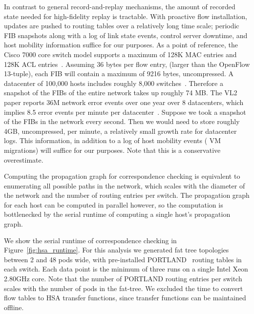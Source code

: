  In contrast to general record-and-replay
mechanisms, the amount of recorded state needed for
high-fidelity replay is tractable. With proactive flow installation, 
updates are pushed to routing tables over a relatively long time scale; periodic
FIB snapshots along with a log of link state events, control server
downtime, and host mobility information suffice for our purposes. As a point of reference, the Cisco 7000 
core switch model supports a maximum of 128K MAC entries and
128K ACL entries~\cite{cisco7000}. Assuming 36 bytes per flow entry,
(larger than the OpenFlow 13-tuple), each FIB will contain a maximum of 9216
bytes, uncompressed. A datacenter of 100,000
hosts includes roughly 8,000
switches~\cite{Al-Fares:2008:SCD:1402958.1402967}.
Therefore a snapshot of the FIBs of the entire network takes up roughly 74 MB.
The VL2 paper reports 36M network error events over one year over 8
datacenters, which implies 8.5 error events per minute per
datacenter~\cite{Greenberg:2009:VSF:1592568.1592576}.
Suppose we took a snapshot of the FIBs in the network every second. 
Then we would need to store roughly 4GB, uncompressed, per minute, a relatively small growth 
rate for datacenter logs. This information, in addition to a log of host
mobility events (\eg{} VM migrations) will suffice for our purposes. Note that this is a conservative overestimate.


 Computing the propagation
graph for correspondence checking is equivalent to enumerating
all possible paths in the network, which scales with the diameter
of the network and the number of routing entries per switch.
The propagation graph for each host can be
computed in parallel however, so the computation is bottlenecked by the serial runtime
of computing a single host's propagation graph.

We show the serial runtime of correspondence checking in 
Figure~\ref{fig:hsa_runtime}. For this analysis we generated fat tree topologies
between 2 and 48 pods wide, with pre-installed PORTLAND~\cite{NiranjanMysore:2009:PSF:1592568.1592575}
routing tables in each switch. Each data point is the minimum of three
runs on a single Intel Xeon 2.80GHz core. Note that the number of PORTLAND routing entries per switch scales with the number
of pods in the fat-tree. We excluded the time to convert
flow tables to HSA transfer functions, since transfer functions can be maintained
offline.

